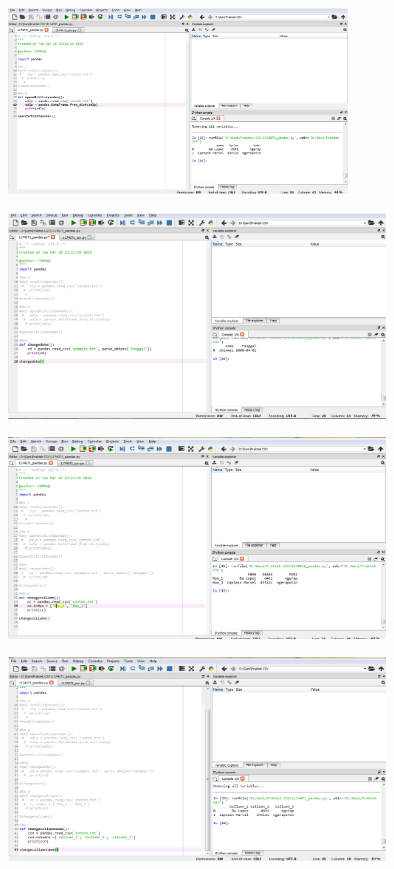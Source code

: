 \begin{figure}[ht]
	\includegraphics[width=9cm]{figures/4/1174071/Praktek/1174071_pandas4.png}
	\centering
\end{figure}
\begin{figure}[ht]
	\includegraphics[width=10cm]{figures/4/1174071/Praktek/1174071_pandas5.png}
	\centering
\end{figure}
\begin{figure}[ht]
	\includegraphics[width=10cm]{figures/4/1174071/Praktek/1174071_pandas6.png}
	\centering
\end{figure}
\begin{figure}[ht]
	\includegraphics[width=10cm]{figures/4/1174071/Praktek/1174071_pandas7.png}
	\centering
\end{figure}
